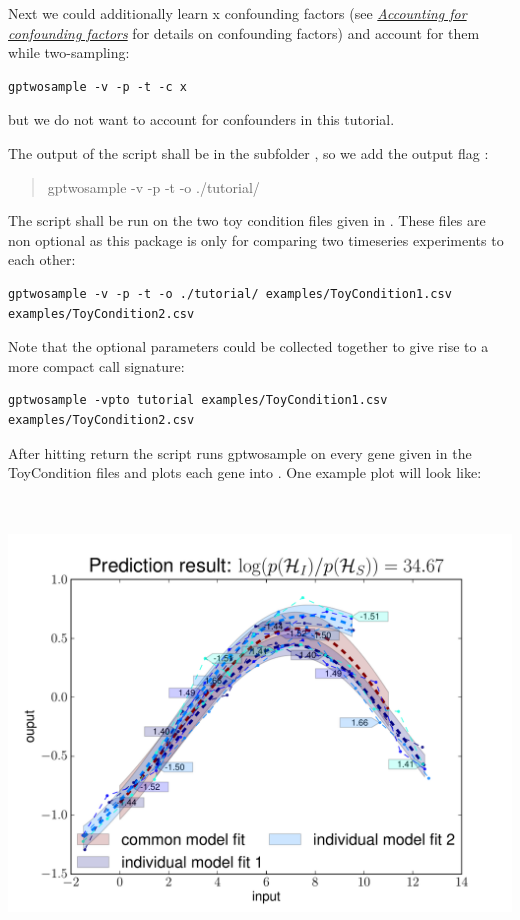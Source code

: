 \documentclass[letterpaper,10pt,english]{sphinxmanual}
\begin{document}
Next we could additionally learn x confounding factors (see
{\hyperref[confounders:confounders]{\emph{Accounting for confounding factors}}} for details on confounding factors) and account
for them while two-sampling:

\begin{Verbatim}[commandchars=\\\{\}]
gptwosample -v -p -t -c x
\end{Verbatim}

but we do not want to account for confounders in this tutorial.

The output of the script shall be in the subfolder , so
we add the output flag :
\begin{quote}

gptwosample -v -p -t -o ./tutorial/
\end{quote}

The script shall be run on the two toy condition files 
given in . These files
are non optional as this package is only for comparing two timeseries
experiments to each other:

\begin{Verbatim}[commandchars=\\\{\}]
gptwosample -v -p -t -o ./tutorial/ examples/ToyCondition1.csv examples/ToyCondition2.csv
\end{Verbatim}

Note that the optional parameters could be collected together to give
rise to a more compact call signature:

\begin{Verbatim}[commandchars=\\\{\}]
gptwosample -vpto tutorial examples/ToyCondition1.csv
examples/ToyCondition2.csv
\end{Verbatim}

After hitting return the script runs gptwosample on every gene given
in the ToyCondition files and plots each gene into
. One example plot will look like:

\includegraphics[height=12cm]{timeshiftexample.pdf}
\end{document}
